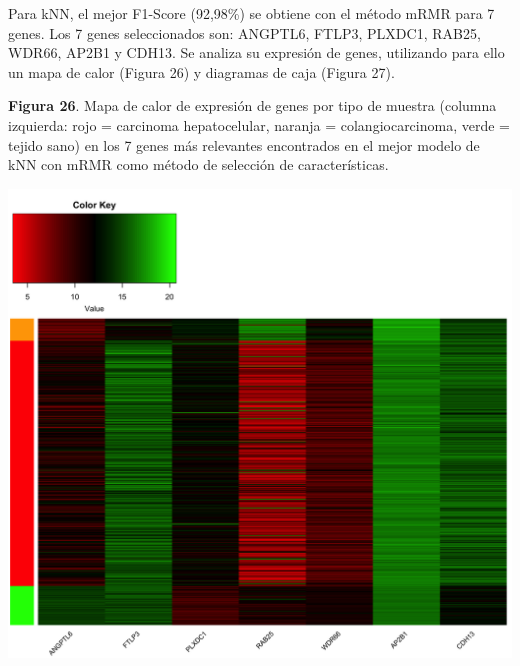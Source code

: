 Para kNN, el mejor F1-Score (92,98\%) se obtiene con el método mRMR para 7 genes. Los 7 genes seleccionados son: ANGPTL6, FTLP3, PLXDC1, RAB25, WDR66, AP2B1 y CDH13. Se analiza su expresión de genes, utilizando para ello un mapa de calor (Figura 26) y diagramas de caja (Figura 27).

\newpage
\begin{center}
\textbf{Figura 26}. Mapa de calor de expresión de genes por tipo de muestra (columna izquierda: rojo = carcinoma hepatocelular, naranja = colangiocarcinoma, verde = tejido sano) en los 7 genes más relevantes encontrados en el mejor modelo de kNN con mRMR como método de selección de características.
\end{center}
\begin{center}
	\includegraphics[width=1\textwidth]{figuras/26_higado_multiclase_33_knn_heatmap_mejor_metodo.png} 
\end{center}

